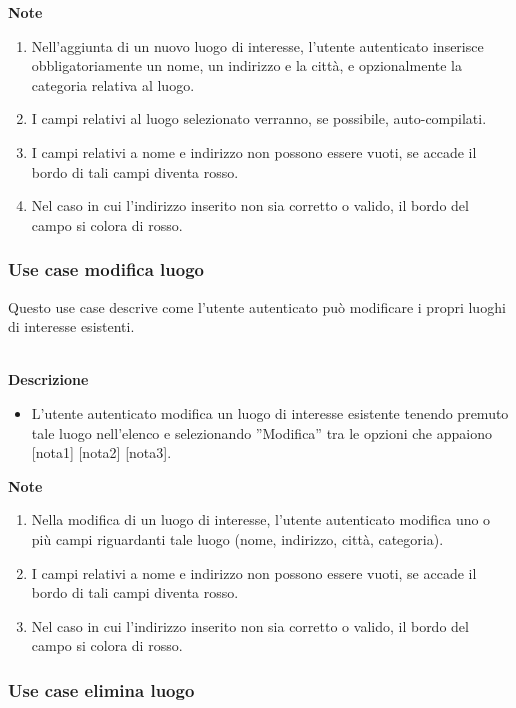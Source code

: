 \documentclass[a4paper,12pt]{article}
\begin{document}
\textbf{Note}
\begin{enumerate} \setlength\itemsep{0.01em}
\item Nell'aggiunta di un nuovo luogo di interesse, l'utente autenticato inserisce obbligatoriamente un nome, un indirizzo e la città, e opzionalmente la categoria relativa al luogo.
\item I campi relativi al luogo selezionato verranno, se possibile, auto-compilati.
\item I campi relativi a nome e indirizzo non possono essere vuoti, se accade il bordo di tali campi diventa rosso.
\item Nel caso in cui l'indirizzo inserito non sia corretto o valido, il bordo del campo si colora di rosso.
\end{enumerate}



\subsubsection*{Use case modifica luogo}

Questo use case descrive come l'utente autenticato può modificare i propri luoghi di interesse esistenti.

\textbf{\\Descrizione}
\begin{itemize} \setlength\itemsep{0.01em}
\item L'utente autenticato modifica un luogo di interesse esistente tenendo premuto tale luogo nell'elenco e selezionando ''Modifica'' tra le opzioni che appaiono [nota1] [nota2] [nota3].
\end{itemize}

\textbf{Note}
\begin{enumerate} \setlength\itemsep{0.01em}
\item Nella modifica di un luogo di interesse, l'utente autenticato modifica uno o più campi riguardanti tale luogo (nome, indirizzo, città, categoria).
\item I campi relativi a nome e indirizzo non possono essere vuoti, se accade il bordo di tali campi diventa rosso.
\item Nel caso in cui l'indirizzo inserito non sia corretto o valido, il bordo del campo si colora di rosso.
\end{enumerate}




\subsubsection*{Use case elimina luogo}
\end{document}
